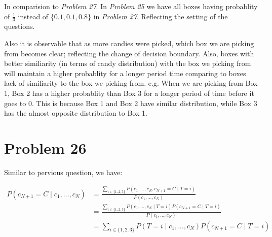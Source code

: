\documentclass[12pt]{article}
\begin{document}
In comparision to \textit{Problem 27}. In \textit{Problem 25} we have all boxes having probablity of $\frac{1}{3}$ instead of $\{0.1, 0.1, 0.8\}$ in \textit{Problem 27}. Reflecting the setting of the questions.

Also it is observable that as more candies were picked, which box we are picking from becomes clear; reflecting the change of decision boundary. Also, boxes with better similiarity (in terms of candy distribution) with the box we picking from will maintain a higher probablity for a longer period time comparing to boxes lack of similiarity to the box we picking from. e.g. When we are picking from Box 1, Box 2 has a higher probablity than Box 3 for a longer period of time before it goes to 0. This is because Box 1 and Box 2 have similar distribution, while Box 3 has the almost opposite distribution to Box 1.

\section{Problem 26}


Similar to pervious question, we have:

\begin{align*}
    P(c_{N+1} = C \mid c_1, \dots, c_N) &= \frac{\sum\limits_{i \in \{1, 2, 3\}} P(c_1, ..., c_N, c_{N+1} = C \mid T = i) }{P(c_1, \dots, c_N)} \\
    &= \frac{\sum\limits_{i \in \{1, 2, 3\}} P(c_1, ..., c_N \mid T = i) P( c_{N+1} = C \mid T = i) }{P(c_1, \dots, c_N)} \\
    &= \sum\limits_{i \in \{1, 2, 3\}} P( T = i\mid c_1, ..., c_N) P( c_{N+1} = C \mid T = i)
\end{align*}
\end{document}
